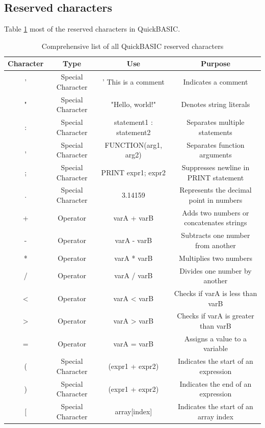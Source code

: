 \documentclass[10pt, reqno]{exam}
\begin{document}
\pagebreak

\subsection{Reserved characters}

Table \ref{tbl:reserved characters} most of the reserved characters in QuickBASIC.

\begin{table}[h]
    \centering
    \caption{Comprehensive list of all QuickBASIC reserved characters}
    \label{tbl:reserved characters}
    \begin{tabular}{|c|c|c|c|}
    \hline
    Character & Type & Use & Purpose \\
    \hline
    ' & Special Character & ' This is a comment & Indicates a comment \\
    " & Special Character & "Hello, world!" & Denotes string literals \\
    : & Special Character & statement1 : statement2 & Separates multiple statements \\
    , & Special Character & FUNCTION(arg1, arg2) & Separates function arguments \\
    ; & Special Character & PRINT expr1; expr2 & Suppresses newline in PRINT statement \\
    . & Special Character & 3.14159 & Represents the decimal point in numbers \\
    + & Operator & varA + varB & Adds two numbers or concatenates strings \\
    - & Operator & varA - varB & Subtracts one number from another \\
    * & Operator & varA * varB & Multiplies two numbers \\
    / & Operator & varA / varB & Divides one number by another \\
    < & Operator & varA < varB & Checks if varA is less than varB \\
    > & Operator & varA > varB & Checks if varA is greater than varB \\
    = & Operator & varA = varB & Assigns a value to a variable \\
    ( & Special Character & (expr1 + expr2) & Indicates the start of an expression \\
    ) & Special Character & (expr1 + expr2) & Indicates the end of an expression \\
    $[$ & Special Character & array[index] & Indicates the start of an array index \\

\end{tabular}
\end{table}
\end{document}
